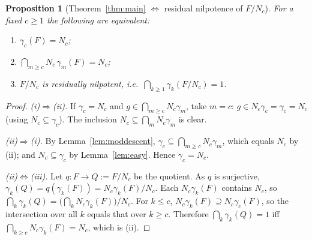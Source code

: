 \documentclass{amsart}
\newtheorem{proposition}{Proposition}
\theoremstyle{definition}
\theoremstyle{remark}
\begin{document}
\begin{proposition}[Theorem~\ref{thm:main} $\Leftrightarrow$ residual nilpotence of $F/N_c$]
\label{prop:equivresnilp}
For a fixed $c\ge1$ the following are equivalent:
\begin{enumerate}
\item[\textup{(i)}] $\gamma_c(F)=N_c$;
\item[\textup{(ii)}] $\bigcap_{m\ge c}N_c\,\gamma_m(F)=N_c$;
\item[\textup{(iii)}] $F/N_c$ is residually nilpotent, i.e.\ $\bigcap_{k\ge1}\gamma_k(F/N_c)=1$.
\end{enumerate}
\end{proposition}
\begin{proof}
\emph{(i)$\Rightarrow$(ii).} If $\gamma_c=N_c$ and $g\in\bigcap_{m\ge c}N_c\gamma_m$,
take $m=c$: $g\in N_c\gamma_c=\gamma_c=N_c$ (using $N_c\subseteq\gamma_c$). The
inclusion $N_c\subseteq\bigcap_m N_c\gamma_m$ is clear.

\emph{(ii)$\Rightarrow$(i).} By Lemma~\ref{lem:moddescent}, $\gamma_c\subseteq
\bigcap_{m\ge c}N_c\gamma_m$, which equals $N_c$ by (ii); and $N_c\subseteq\gamma_c$
by Lemma~\ref{lem:easy}. Hence $\gamma_c=N_c$.

\emph{(ii)$\Leftrightarrow$(iii).} Let $q\colon F\to Q:=F/N_c$ be the quotient. As
$q$ is surjective, $\gamma_k(Q)=q(\gamma_k(F))=N_c\gamma_k(F)/N_c$. Each
$N_c\gamma_k(F)$ contains $N_c$, so
$\bigcap_k\gamma_k(Q)=\big(\bigcap_k N_c\gamma_k(F)\big)/N_c$. For $k\le c$,
$N_c\gamma_k(F)\supseteq N_c\gamma_c(F)$, so the intersection over all $k$ equals that
over $k\ge c$. Therefore $\bigcap_k\gamma_k(Q)=1$ iff $\bigcap_{k\ge c}N_c\gamma_k(F)
=N_c$, which is (ii).
\end{proof}
\end{document}
